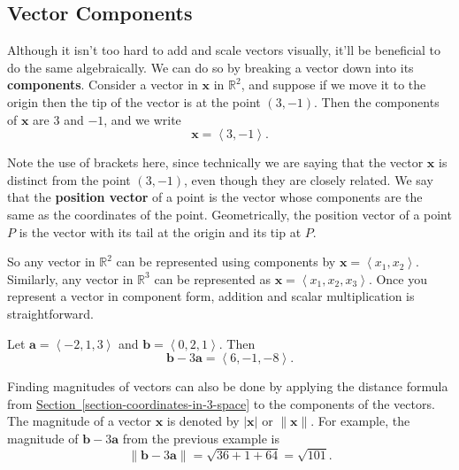 \documentclass[10pt,]{book}
\newcommand{\terminology}[1]{\textbf{#1}}
\theoremstyle{ptxplainnotitle}
\theoremstyle{ptxplaintitle}
\theoremstyle{ptxplainnotitle}
\theoremstyle{ptxplaintitle}
\theoremstyle{ptxplainnotitle}
\theoremstyle{ptxplaintitle}
\theoremstyle{ptxdefinitionnotitle}
\theoremstyle{ptxdefinitiontitle}
\theoremstyle{ptxdefinitionnotitle}
\theoremstyle{ptxdefinitiontitle}
\theoremstyle{ptxdefinitionnotitle}
\theoremstyle{ptxdefinitiontitle}
\theoremstyle{ptxdefinitionnotitle}
\theoremstyle{ptxdefinitiontitle}
\theoremstyle{ptxdefinitionnotitle}
\theoremstyle{ptxdefinitiontitle}
\numberwithin{equation}{section}
\newcommand{\RR}{\mathbb{R}}
\newcommand{\vv}[1]{\mathbf{#1}}
\newcommand{\dotprod}[1]{\left\langle #1 \right\rangle}
\begin{document}
\subsection[{Vector Components}]{Vector Components}\label{subsection-vector-components}
\hypertarget{p-745}{}%
Although it isn't too hard to add and scale vectors visually, it'll be beneficial to do the same algebraically. We can do so by breaking a vector down into its \terminology{components}. Consider a vector in \(\vv{x}\) in \(\RR^{2}\), and suppose if we move it to the origin then the tip of the vector is at the point \((3,-1)\). Then the components of \(\vv{x}\) are \(3\) and \(-1\), and we write%
\begin{equation*}
\vv{x} = \dotprod{3,-1}.
\end{equation*}
%
\par
\hypertarget{p-746}{}%
Note the use of brackets here, since technically we are saying that the vector \(\vv{x}\) is distinct from the point \((3,-1)\), even though they are closely related. We say that the \terminology{position vector} of a point is the vector whose components are the same as the coordinates of the point. Geometrically, the position vector of a point \(P\) is the vector with its tail at the origin and its tip at \(P\).%
\par
\hypertarget{p-747}{}%
So any vector in \(\RR^{2}\) can be represented using components by \(\vv{x} = \dotprod{x_{1},x_{2}}\). Similarly, any vector in \(\RR^{3}\) can be represented as \(\vv{x} = \dotprod{x_{1},x_{2},x_{3}}\). Once you represent a vector in component form, addition and scalar multiplication is straightforward.%
\begin{example}\label{example-vector-addition-with-components}
\hypertarget{p-748}{}%
Let \(\vv{a} = \dotprod{-2,1,3}\) and \(\vv{b} = \dotprod{0,2,1}\). Then%
%
\begin{equation*}
\vv{b}-3\vv{a} = \dotprod{6,-1,-8}.
\end{equation*}
\end{example}
\hypertarget{p-749}{}%
Finding magnitudes of vectors can also be done by applying the distance formula from \hyperref[section-coordinates-in-3-space]{Section~\ref{section-coordinates-in-3-space}} to the components of the vectors. The magnitude of a vector \(\vv{x}\) is denoted by \(|\vv{x}|\) or \(\|\vv{x}\|\). For example, the magnitude of \(\vv{b}-3\vv{a}\) from the previous example is%
\begin{equation*}
\|\vv{b}-3\vv{a}\| = \sqrt{36+1+64} = \sqrt{101}.
\end{equation*}
\end{document}
